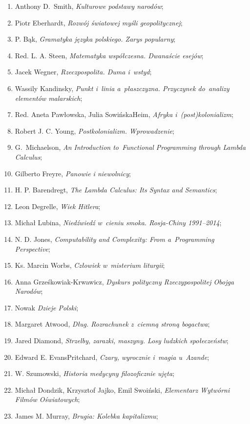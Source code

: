 \documentclass[a4paper,11pt]{article}
\begin{document}
\begin{enumerate}
\item Anthony D.~Smith, \emph{Kulturowe podstawy narodów};
\item Piotr Eberhardt, \emph{Rozwój światowej myśli geopolitycznej};
\item P. Bąk, \emph{Gramatyka języka polskiego. Zarys popularny};
\item Red. L. A. Steen, \emph{Matematyka współczesna. Dwanaście
    esejów};
\item Jacek Wegner, \emph{Rzeczpospolita. Duma i~wstyd};
\item Wassily Kandinsky, \emph{Punkt i~linia a~płaszczyzna. Przyczynek
    do~analizy elementów malarskich};
\item Red. Aneta Pawłowska, Julia Sowińska\dywiz Heim, \emph{Afryka
    i~(post)kolonializm};
\item Robert J. C. Young, \emph{Postkolonializm. Wprowadzenie};
\item G.~Michaelson, \emph{An Introduction to~Functional Programming
    through Lambda Calculus};
\item Gilberto Freyre, \emph{Panowie i niewolnicy};
\item H. P. Barendregt, \emph{The Lambda Calculus: Its Syntax and
    Semantics};
\item Leon Degrelle, \emph{Wiek Hitlera};
\item Michał Lubina, \emph{Niedźwiedź w~cieniu smoka. Rosja-Chiny
    1991--2014};
\item N. D. Jones, \emph{Computability and Complexity: From
    a~Programming Perspective};
\item Ks. Marcin Worbs, \emph{Człowiek w~misterium liturgii};
\item Anna Grześkowiak-Krwawicz, \emph{Dyskurs polityczny
    Rzeczypospolitej Obojga Narodów};
\item Nowak \emph{Dzieje Polski};
\item Margaret Atwood, \emph{Dług. Rozrachunek z~ciemną stroną
    bogactwa};
\item Jared Diamond, \emph{Strzelby, zarazki, maszyny. Losy ludzkich
    społeczeństw};
\item Edward E. Evans\dywiz Pritchard, \emph{Czary, wyrocznie i~magia
    u~Azande};
\item W. Szumowski, \emph{Historia medycyny filozoficznie ujęta};
\item Michał Dondzik, Krzysztof Jajko, Emil Swoiński, \emph{Elementarz
    Wytwórni Filmów Oświatowych};
\item James M. Murray, \emph{Brugia: Kolebka kapitalizmu};

\end{enumerate}
\end{document}
